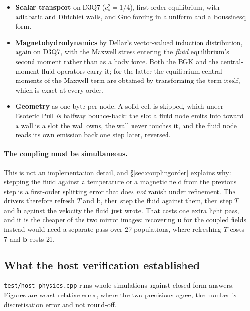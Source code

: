 \documentclass[11pt,a4paper]{article}
\newcommand{\code}[1]{\texttt{\small #1}}
\newcommand{\cs}{c_s}
\newcommand{\uu}{\bm{u}}
\newcommand{\bb}{\bm{b}}
\begin{document}
\begin{itemize}[leftmargin=1.4em,itemsep=3pt]
\item \textbf{Scalar transport} on D3Q7 ($\cs^2=1/4$), first-order equilibrium,
  with adiabatic and Dirichlet walls, and Guo forcing in a uniform and a
  Boussinesq form.
\item \textbf{Magnetohydrodynamics} by Dellar's vector-valued induction
  distribution, again on D3Q7, with the Maxwell stress entering the
  \emph{fluid} equilibrium's second moment rather than as a body force. Both the
  BGK and the central-moment fluid operators carry it; for the latter the
  equilibrium central moments of the Maxwell term are obtained by transforming
  the term itself, which is exact at every order.
\item \textbf{Geometry} as one byte per node. A solid cell is skipped, which
  under Esoteric Pull \emph{is} halfway bounce-back: the slot a fluid node emits
  into toward a wall is a slot the wall owns, the wall never touches it, and the
  fluid node reads its own emission back one step later, reversed.
\end{itemize}

\paragraph{The coupling must be simultaneous.} This is not an implementation
detail, and \S\ref{sec:couplingorder} explains why: stepping the fluid against a
temperature or a magnetic field from the previous step is a first-order splitting
error that does \emph{not} vanish under refinement. The drivers therefore refresh
$T$ and $\bb$, then step the fluid against them, then step $T$ and $\bb$ against
the velocity the fluid just wrote. That costs one extra light pass, and it is the
cheaper of the two mirror images: recovering $\uu$ for the coupled fields instead
would need a separate pass over 27 populations, where refreshing $T$ costs 7 and
$\bb$ costs 21.

\subsection{What the host verification established}

\code{test/host\_physics.cpp} runs whole simulations against closed-form answers.
Figures are worst relative error; where the two precisions agree, the number is
discretisation error and not round-off.
\end{document}
